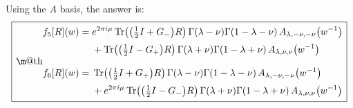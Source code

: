 \documentclass[12pt]{article}
\makeatletter
\newcommand*{\wideboxed}[1]{\setlength{\fboxsep}{1ex}%
  \fbox{\m@th$\displaystyle#1$}}
\newcommand*{\bra}[1]{\langle{#1}|}
\newcommand*{\ket}[1]{|{#1}\rangle}
\DeclareMathOperator{\Tr}{Tr}
\newcommand{\rar}{{\rightarrow}}
\newcommand{\IN}{\text{in}}
\newcommand{\OUT}{\text{out}}
\makeatother
\begin{document}
Using the $A$ basis, the answer is:
\begin{equation}\label{tpf-56}
\wideboxed{
\begin{aligned}
f_{5}[R](w)&=\begin{aligned}[t]
&e^{2\pi i\mu} \Tr \bigl(\bigl( \tfrac{1}{2}I+G_{-} \bigr)R \bigr)\,
\Gamma(\lambda-\nu)\Gamma(1-\lambda-\nu)\,A_{\lambda,-\nu,-\nu}\big(w^{-1}\big)
\\[2pt]
&+\Tr\bigl(\bigl(\tfrac{1}{2}I-G_{+}\bigr)R \bigr)\,
\Gamma(\lambda+\nu)\Gamma(1-\lambda+\nu)\,A_{\lambda,\nu,\nu}\big(w^{-1}\big)
\end{aligned}
\\[8pt]
f_{6}[R](w)&=\begin{aligned}[t]
&\Tr\bigl(\bigl(\tfrac{1}{2}I+G_{+}\bigr)R \bigr)\,
\Gamma(\lambda-\nu)\Gamma(1-\lambda-\nu)\,A_{\lambda,-\nu,-\nu}\big(w^{-1}\big)
\\[2pt]
&+e^{2\pi i\mu} \Tr\bigl(\bigl(\tfrac{1}{2}I-G_{-}\bigr)R \bigr)\,
\Gamma(\lambda+\nu)\Gamma(1-\lambda+\nu)\,A_{\lambda,\nu,\nu}\big(w^{-1}\big)
\end{aligned}
\end{aligned}
}
\end{equation}
\end{document}
